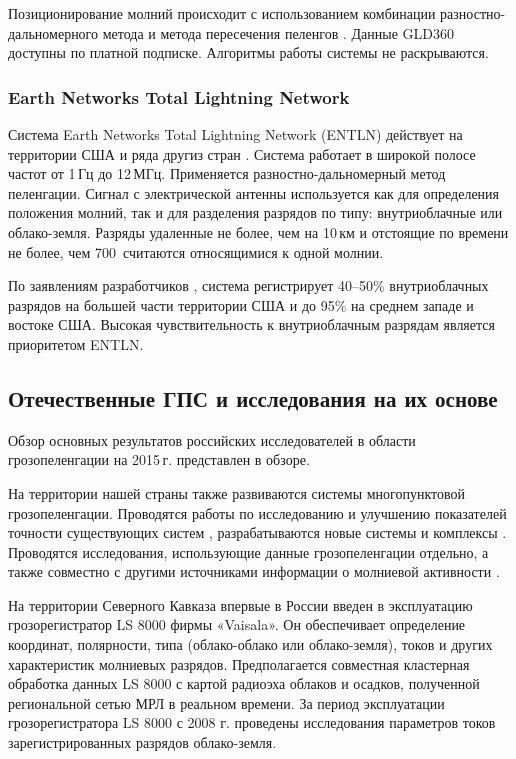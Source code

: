 Позиционирование молний происходит с использованием комбинации разностно-дальномерного метода и метода пересечения пеленгов \cite{Rakov-emld}. Данные GLD360 доступны по платной подписке. Алгоритмы работы системы не раскрываются.

\subsubsection{Earth Networks Total Lightning Network}
Система Earth Networks Total Lightning Network (ENTLN) действует на территории США и ряда другиз стран \cite{Rakov-emld}. Система работает в широкой полосе частот от 1\,Гц до 12\,МГц. Применяется разностно-дальномерный метод пеленгации. Сигнал с электрической антенны используется как для определения положения молний, так и для разделения разрядов по типу: внутриоблачные или облако-земля. Разряды удаленные не более, чем на 10\,км и отстоящие по времени не более, чем 700\, считаются относящимися к одной молнии. \cite{Heckman2010}

По заявлениям разработчиков \cite{Heckman2010}, система регистрирует 40--50\% внутриоблачных разрядов на большей части территории США и до 95\% на среднем западе и востоке США. Высокая чувствительность к внутриоблачным разрядам является приоритетом ENTLN.

\subsection{Отечественные ГПС и исследования на их основе}
Обзор основных результатов российских исследователей в области грозопеленгации на 2015\,г. представлен в обзоре\cite{MareevWe2016}.

На территории нашей страны также развиваются системы многопунктовой грозопеленгации. Проводятся работы по исследованию и улучшению показателей точности существующих систем \cite{Kononov2014,Kononov2013}, разрабатываются новые системы и комплексы \cite{Adjiev2013,BulatovMiG}. Проводятся исследования, использующие данные грозопеленгации отдельно, а также совместно с другими источниками информации о молниевой активности \cite{Buharov2013}.

На территории Северного Кавказа впервые в России введен в эксплуатацию грозорегистратор LS 8000 фирмы «Vaisala». Он обеспечивает определение координат, полярности, типа (облако-облако или облако-земля), токов и других характеристик молниевых разрядов. Предполагается совместная кластерная обработка данных LS 8000 с картой радиоэха облаков и осадков, полученной региональной сетью МРЛ в реальном времени. За период эксплуатации грозорегистратора LS 8000 с 2008 г. проведены исследования параметров токов зарегистрированных разрядов облако-земля. \cite{Adjiev2013} 

